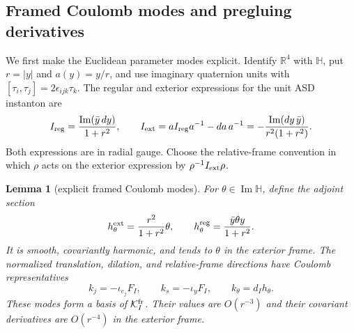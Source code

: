 \documentclass[11pt]{amsart}
\newtheorem{lemma}[theorem]{Lemma}
\theoremstyle{definition}
\theoremstyle{remark}
\theoremstyle{plain}
\newcommand{\RR}{\mathbb{R}}
\newcommand{\cK}{\mathcal{K}}
\begin{document}
\subsection{Framed Coulomb modes and pregluing derivatives}
We first make the Euclidean parameter modes explicit.  Identify
$\RR^4$ with $\mathbb H$, put $r=|y|$ and $a(y)=y/r$, and use
imaginary quaternion units with $[\tau_i,\tau_j]=2\epsilon_{ijk}\tau_k$.
The regular and exterior expressions for the unit ASD instanton are
\begin{equation}\label{eq:quaternion-instanton}
 I_{\rm reg}=\frac{\operatorname{Im}(\bar y\,dy)}{1+r^2},\qquad
 I_{\rm ext}=aI_{\rm reg}a^{-1}-da\,a^{-1}
 =-\frac{\operatorname{Im}(dy\,\bar y)}{r^2(1+r^2)}.
\end{equation}
Both expressions are in radial gauge.  Choose the relative-frame
convention in which $\rho$ acts on the exterior expression by
$\rho^{-1}I_{\rm ext}\rho$.

\begin{lemma}[explicit framed Coulomb modes]\label{lem:framed-coulomb-modes}
For $\theta\in\operatorname{Im}\mathbb H$, define the adjoint section
\begin{equation}\label{eq:harmonic-frame-gauge}
 h_\theta^{\rm ext}=\frac{r^2}{1+r^2}\theta,\qquad
 h_\theta^{\rm reg}=\frac{\bar y\theta y}{1+r^2}.
\end{equation}
It is smooth, covariantly harmonic, and tends to $\theta$ in the
exterior frame.  The normalized translation, dilation, and relative-frame
directions have Coulomb representatives
\begin{equation}\label{eq:explicit-coulomb-modes}
 k_j=-\iota_{e_j}F_I,\qquad k_s=-\iota_yF_I,\qquad
 k_\theta=d_Ih_\theta.
\end{equation}
These modes form a basis of $\cK_I^{\rm fr}$.
Their values are $O(r^{-3})$ and their covariant derivatives are
$O(r^{-4})$ in the exterior frame.
\end{lemma}
\end{document}
